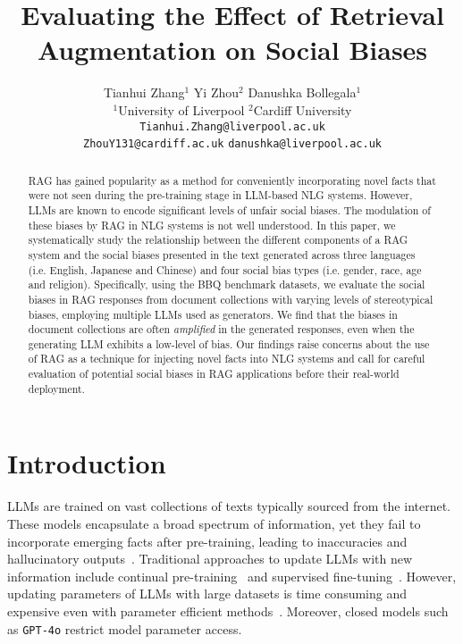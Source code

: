\documentclass[11pt,a4paper]{article}
\title{Evaluating the Effect of Retrieval Augmentation on Social Biases}
\author{Tianhui Zhang$^{1}$ \quad
        Yi Zhou$^{2}$\quad
        Danushka Bollegala$^{1}$ \\
        $^1$University of Liverpool\quad
        $^2$Cardiff University \\
        {\tt Tianhui.Zhang@liverpool.ac.uk} \\
        {\tt ZhouY131@cardiff.ac.uk} \quad
        {\tt danushka@liverpool.ac.uk}
}
\date{}
\begin{document}
\maketitle



\begin{abstract}
    \ac{RAG} has gained popularity as a method for conveniently incorporating novel facts that were not seen during the pre-training stage in \ac{LLM}-based \ac{NLG} systems.
    However, \acp{LLM} are known to encode significant levels of unfair social biases.
    The modulation of these biases by \ac{RAG} in \ac{NLG} systems is not well understood.
    In this paper, we systematically study the relationship between the different components of a \ac{RAG} system and the social biases presented in the text generated across three languages (i.e. English, Japanese and Chinese) and four social bias types (i.e. gender, race, age and religion).
    Specifically, using the \ac{BBQ} benchmark datasets, we evaluate the social biases in \ac{RAG} responses from document collections with varying levels of stereotypical biases, employing multiple \acp{LLM} used as generators.
    We find that the biases in document collections are often \emph{amplified} in the generated responses, even when the generating \ac{LLM} exhibits a low-level of bias.
    Our findings raise concerns about the use of \ac{RAG} as a technique for injecting novel facts into \ac{NLG} systems and call for careful evaluation of potential social biases in \ac{RAG} applications before their real-world deployment. 
\end{abstract}

\section{Introduction}
\label{sec:intro}

\acp{LLM} are trained on vast collections of texts typically sourced from the internet. 
These models encapsulate a broad spectrum of information, yet they fail to incorporate emerging facts after pre-training, leading to inaccuracies and hallucinatory outputs~\citep{Song:2024a,Niu:2024,Agrawal:2024}.
Traditional approaches to update \acp{LLM} with new information include continual pre-training~\cite{Ke:2022} and supervised fine-tuning~\cite{Ouyang:2022}.
However, updating parameters of \acp{LLM} with large datasets is time consuming and expensive even with parameter efficient methods~\cite{Hu:2021}.
Moreover, closed models such as \texttt{GPT-4o} restrict model parameter access.
\end{document}
